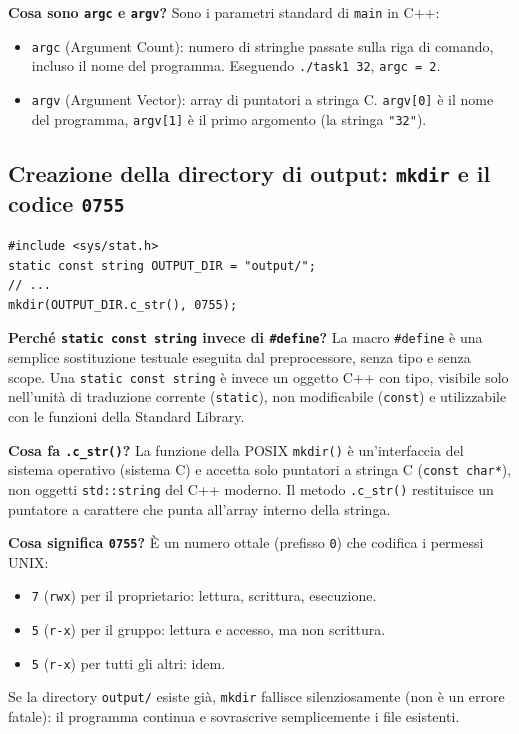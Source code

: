 \documentclass[a4paper,11pt]{article}
\theoremstyle{definition}
\begin{document}
\textbf{Cosa sono \texttt{argc} e \texttt{argv}?} Sono i parametri standard di \texttt{main} in C++:
\begin{itemize}
  \item \texttt{argc} (Argument Count): numero di stringhe passate sulla riga di comando, incluso il nome del programma. Eseguendo \texttt{./task1 32}, \texttt{argc = 2}.
  \item \texttt{argv} (Argument Vector): array di puntatori a stringa C. \texttt{argv[0]} è il nome del programma, \texttt{argv[1]} è il primo argomento (la stringa \texttt{"32"}).
\end{itemize}

\subsection{Creazione della directory di output: \texttt{mkdir} e il codice \texttt{0755}}

\begin{lstlisting}[style=cpp, caption={Creazione sicura della directory output/}]
#include <sys/stat.h>
static const string OUTPUT_DIR = "output/";
// ...
mkdir(OUTPUT_DIR.c_str(), 0755);
\end{lstlisting}

\textbf{Perché \texttt{static const string} invece di \texttt{\#define}?} La macro \texttt{\#define} è una semplice sostituzione testuale eseguita dal preprocessore, senza tipo e senza scope. Una \texttt{static const string} è invece un oggetto C++ con tipo, visibile solo nell'unità di traduzione corrente (\texttt{static}), non modificabile (\texttt{const}) e utilizzabile con le funzioni della Standard Library.

\textbf{Cosa fa \texttt{.c\_str()}?} La funzione della POSIX \texttt{mkdir()} è un'interfaccia del sistema operativo (sistema C) e accetta solo puntatori a stringa C (\texttt{const char*}), non oggetti \texttt{std::string} del C++ moderno. Il metodo \texttt{.c\_str()} restituisce un puntatore a carattere che punta all'array interno della stringa.

\textbf{Cosa significa \texttt{0755}?} È un numero ottale (prefisso \texttt{0}) che codifica i permessi UNIX:
\begin{itemize}
  \item \texttt{7} (\texttt{rwx}) per il proprietario: lettura, scrittura, esecuzione.
  \item \texttt{5} (\texttt{r-x}) per il gruppo: lettura e accesso, ma non scrittura.
  \item \texttt{5} (\texttt{r-x}) per tutti gli altri: idem.
\end{itemize}
Se la directory \texttt{output/} esiste già, \texttt{mkdir} fallisce silenziosamente (non è un errore fatale): il programma continua e sovrascrive semplicemente i file esistenti.
\end{document}
